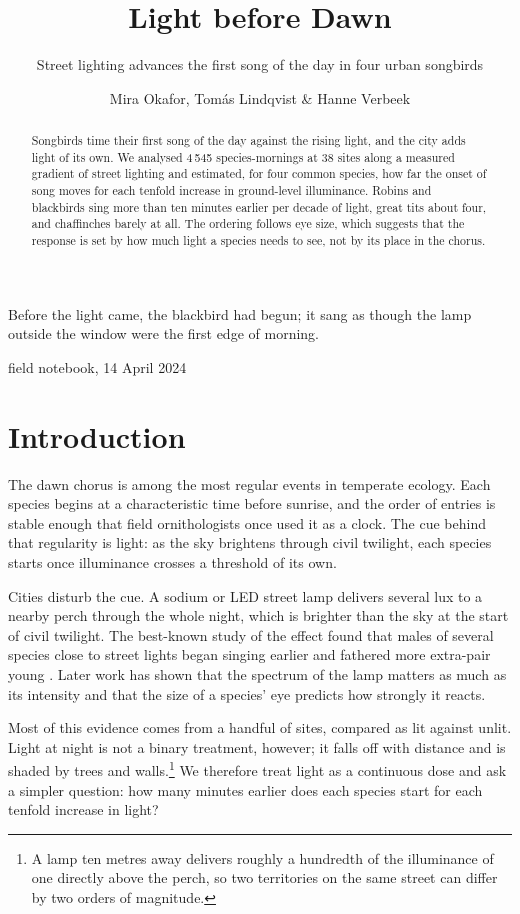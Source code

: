 \documentclass[11pt]{article}
\title{Light before Dawn}
\subtitle{Street lighting advances the first song of the day in four urban songbirds}
\author{Mira Okafor, Tomás Lindqvist \& Hanne Verbeek}
\affiliation{Halden Institute for Urban Ecology, Department of Behavioural Biology}
\newcommand{\sidecite}[2][]{\sidenote{\fullcite[#1]{#2}.}}
\begin{document}
\maketitle

\epigraph{Before the light came, the blackbird had begun; it sang as though the
  lamp outside the window were the first edge of morning.}
  {field notebook, 14 April 2024}

\begin{abstract}
Songbirds time their first song of the day against the rising light, and the
city adds light of its own. We analysed 4\,545 species-mornings at 38 sites along a
measured gradient of street lighting and estimated, for four common species, how
far the onset of song moves for each tenfold increase in ground-level
illuminance. Robins and blackbirds sing more than ten minutes earlier per decade
of light, great tits about four, and chaffinches barely at all. The ordering
follows eye size, which suggests that the response is set by how much light a
species needs to see, not by its place in the chorus.
\end{abstract}

\section{Introduction}

The dawn chorus is among the most regular events in temperate ecology. Each
species begins at a characteristic time before sunrise, and the order of
entries is stable enough that field ornithologists once used it as a clock.%
\sidecite{marler2004} The cue behind that regularity is light: as the sky
brightens through civil twilight, each species starts once illuminance crosses
a threshold of its own.

Cities disturb the cue. A sodium or LED street lamp delivers several lux to a
nearby perch through the whole night, which is brighter than the sky at the
start of civil twilight. The best-known study of the effect found that males
of several species close to street lights began singing earlier and fathered
more extra-pair young \parencite{kempenaers2010}. Later work has shown that the
spectrum of the lamp matters as much as its intensity\sidecite{hale2017} and
that the size of a species' eye predicts how strongly it reacts.%
\sidecite{moreau2022}

Most of this evidence comes from a handful of sites, compared as lit against
unlit. Light at night is not a binary treatment, however; it falls off with
distance and is shaded by trees and walls.\footnote{A lamp ten metres away
  delivers roughly a hundredth of the illuminance of one directly above the
  perch, so two territories on the same street can differ by two orders of
  magnitude.} We therefore treat light as a continuous dose and ask a simpler
question: how many minutes earlier does each species start for each tenfold
increase in light?
\end{document}
